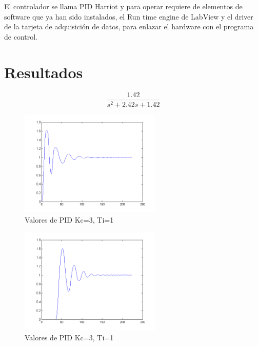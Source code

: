 \documentclass[]{article}
\begin{document}
		El controlador se llama PID Harriot y para operar requiere de elementos de software que ya han sido instalados, el Run time engine de LabView y el driver de la tarjeta de adquisición de datos, para enlazar el hardware con el programa de control.\\

	
\section{Resultados}





\begin{equation}
  \frac{1.42}{s^2+2.42s+1.42}
\end{equation}



\begin{figure}[h!]
	\centering
	\includegraphics[width=0.6\textwidth]{Imagenes/modelo2Const}
	\caption{Valores de PID Kc=3, Ti=1}
	\label{fig:modeloConst}
\end{figure}

\begin{figure}[h!]
	\centering
	\includegraphics[width=0.6\textwidth]{Imagenes/modeloEscalon}
	\caption{Valores de PID Kc=3, Ti=1}
	\label{fig:modeloEscalon}
\end{figure}
\end{document}
